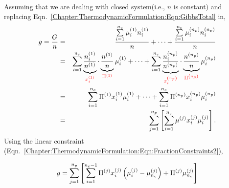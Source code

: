 Assuming that we are dealing with closed system(i.e., $n$ is constant) and replacing Eqn.~\ref{Chapter:ThermodynamicFormulation:Eqn:GibbsTotal} in,
\begin{eqnarray}
     g = \frc{G}{n} &=& \frc{\summation_{i=1}^{n_{c}}\mfr[\mu]{i}{1}\mfr[n]{i}{1}}{n} +  \cdots +  \frc{\summation_{i=1}^{n_{c}}\mfr[\mu]{i}{n_{p}}\mfr[n]{i}{n_{p}}}{n} \nonumber \\
       &=& \summation_{i=1}^{n_{c}} \underbrace{\frc{\mfr[n]{i}{1}}{\mfr[n]{}{1}}}_{\red{\mfr[x]{i}{1}}} \cdot\underbrace{\frc{\mfr[n]{}{1}}{n}}_{\red{\mfr[\Pi]{}{1}}}\mfr[\mu]{i}{1} + \cdots + \summation_{i=1}^{n_{c}} \underbrace{\frc{\mfr[n]{i}{n_{p}}}{\mfr[n]{}{n_{p}}}}_{\red{\mfr[x]{i}{n_{p}}}} \cdot\underbrace{\frc{\mfr[n]{}{n_{p}}}{n}}_{\red{\mfr[\Pi]{}{n_{p}}}}\mfr[\mu]{i}{n_{p}} \nonumber \\
      &=& \summation_{i=1}^{n_{c}} \mfr[\Pi]{}{1}\mfr[x]{i}{1}\mfr[\mu]{i}{1} + \cdots + \summation_{i=1}^{n_{c}} \mfr[\Pi]{}{n_{p}}\mfr[x]{i}{n_{p}}\mfr[\mu]{i}{n_{p}} \nonumber \\
      &=& \summation_{j=1}^{n_{p}}\left[\summation_{i=1}^{n_{c}} \mfr[\mu]{}{j}\mfr[x]{i}{j}\mfr[\mu]{i}{j}\right].
\end{eqnarray}
Using the linear constraint (Eqn.~\ref{Chapter:ThermodynamicFormulation:Eqn:FractionConstraints2}),
\begin{shaded}\noindent
   \begin{equation}
      g = \summation_{j=1}^{n_{p}}\left[\summation_{i=1}^{n_{c}-1} \mfr[\Pi]{}{j}\mfr[x]{i}{j}\left(\mfr[\mu]{i}{j}-\mfr[\mu]{n_{c}}{j}\right) + \mfr[\Pi]{}{j}\mfr[\mu]{n_{c}}{j}\right]\label{Chapter:ThermodynamicFormulation:Eqn:GibbsMolar1}
   \end{equation}
\end{shaded}

